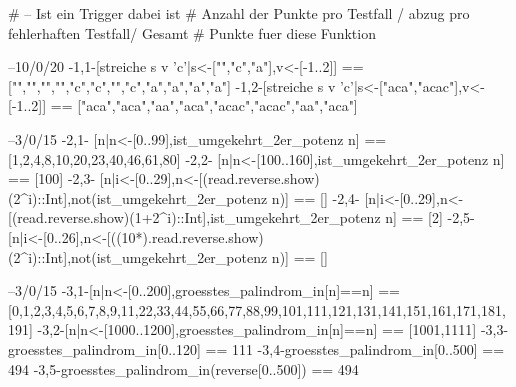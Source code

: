 
# -- Ist ein Trigger dabei ist
# Anzahl der Punkte pro Testfall / abzug pro fehlerhaften Testfall/ Gesamt
# Punkte fuer diese Funktion


--10/0/20
{-1,1-}[streiche s v 'c'|s<-["","c","a"],v<-[-1..2]] == ["","","","","c","c","","c","a","a","a","a"]
{-1,2-}[streiche s v 'c'|s<-["aca","acac"],v<-[-1..2]] == ["aca","aca","aa","aca","acac","acac","aa","aca"]

--3/0/15
{-2,1-} [n|n<-[0..99],ist_umgekehrt_2er_potenz n] == [1,2,4,8,10,20,23,40,46,61,80]
{-2,2-} [n|n<-[100..160],ist_umgekehrt_2er_potenz n] == [100]
{-2,3-} [n|i<-[0..29],n<-[(read.reverse.show)(2^i)::Int],not(ist_umgekehrt_2er_potenz n)] == []
{-2,4-} [n|i<-[0..29],n<-[(read.reverse.show)(1+2^i)::Int],ist_umgekehrt_2er_potenz n] == [2]
{-2,5-} [n|i<-[0..26],n<-[((10*).read.reverse.show)(2^i)::Int],not(ist_umgekehrt_2er_potenz n)] == []

--3/0/15
{-3,1-}[n|n<-[0..200],groesstes_palindrom_in[n]==n] == [0,1,2,3,4,5,6,7,8,9,11,22,33,44,55,66,77,88,99,101,111,121,131,141,151,161,171,181,191]
{-3,2-}[n|n<-[1000..1200],groesstes_palindrom_in[n]==n] == [1001,1111]
{-3,3-}groesstes_palindrom_in[0..120] == 111
{-3,4-}groesstes_palindrom_in[0..500] == 494
{-3,5-}groesstes_palindrom_in(reverse[0..500]) == 494

